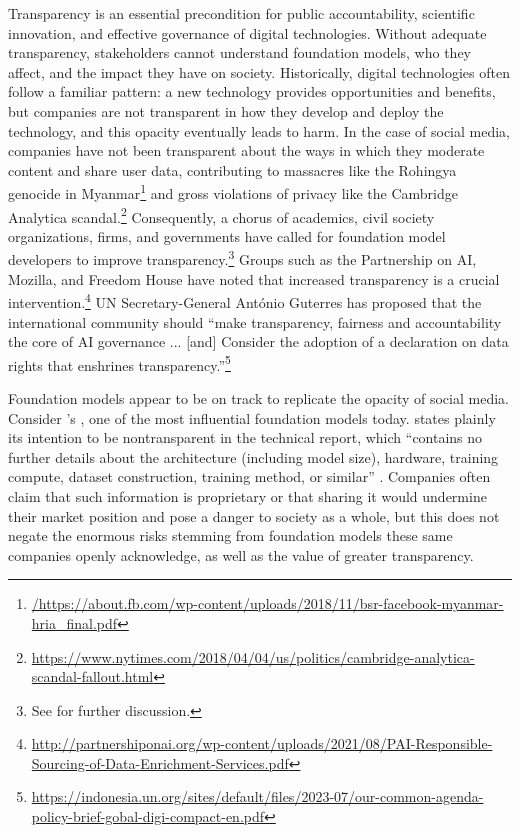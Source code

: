 \documentclass[screen, authorversion, acmsmall]{acmart}
\begin{document}
Transparency is an essential precondition for public accountability, scientific innovation, and effective governance of digital technologies.
Without adequate transparency, stakeholders cannot understand foundation models, who they affect, and the impact they have on society.
Historically, digital technologies often follow a familiar pattern: a new technology provides opportunities and benefits, but companies are not transparent in how they develop and deploy the technology, and this opacity eventually leads to harm. 
In the case of social media, companies have not been transparent about the ways in which they moderate content and share user data, contributing to massacres like the Rohingya genocide in Myanmar\footnote{\url{/https://about.fb.com/wp-content/uploads/2018/11/bsr-facebook-myanmar-hria_final.pdf}} and gross violations of privacy like the Cambridge Analytica scandal.\footnote{\url{https://www.nytimes.com/2018/04/04/us/politics/cambridge-analytica-scandal-fallout.html}}
Consequently, a chorus of academics, civil society organizations, firms, and governments have called for foundation model developers to improve transparency.\footnote{See  for further discussion.} 
Groups such as the Partnership on AI, Mozilla, and Freedom House have noted that increased transparency is a crucial intervention.\footnote{\url{http://partnershiponai.org/wp-content/uploads/2021/08/PAI-Responsible-Sourcing-of-Data-Enrichment-Services.pdf}}
UN Secretary-General António Guterres has proposed that the international community should “make transparency, fairness and accountability the core of AI governance ... [and] Consider the adoption of a declaration on data rights that enshrines transparency.”\footnote{\url{https://indonesia.un.org/sites/default/files/2023-07/our-common-agenda-policy-brief-gobal-digi-compact-en.pdf}} 

Foundation models appear to be on track to replicate the opacity of social media. 
Consider \openai's \gptfour, one of the most influential foundation models today. 
\openai states plainly its intention to be nontransparent in the \gptfour technical report, which “contains no further details about the architecture (including model size), hardware, training compute, dataset construction, training method, or similar” \citep{openai2023gpt4}. 
Companies often claim that such information is proprietary or that sharing it would undermine their market position and pose a danger to society as a whole, but this does not negate the enormous risks stemming from foundation models these same companies openly acknowledge, as well as the value of greater transparency. 
\end{document}

